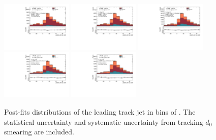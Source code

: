 \begin{figure}[htbp]
  \centering
 \includegraphics[width=0.3\textwidth]{figures/gbb/Sub_Sd0_Fits/Canv_Fit_0-Zp_T-01_coarse_x.pdf}
 \includegraphics[width=0.3\textwidth]{figures/gbb/Sub_Sd0_Fits/Canv_Fit_01-Zp_T-02_coarse_x.pdf}
 \includegraphics[width=0.3\textwidth]{figures/gbb/Sub_Sd0_Fits/Canv_Fit_02-Zp_T-03_coarse_x.pdf}\\
 \includegraphics[width=0.3\textwidth]{figures/gbb/Sub_Sd0_Fits/Canv_Fit_03-Zp_T-04_coarse_x.pdf}
 \includegraphics[width=0.3\textwidth]{figures/gbb/Sub_Sd0_Fits/Canv_Fit_04-Zp_T-05_coarse_x.pdf}


\caption{Post-fits \subsdzero distributions of the leading track jet in bins of \zpt. The statistical uncertainty and systematic uncertainty from tracking $d_0$ smearing are included.}
  \label{fig:ZpT-postfits-leading-sub}
\end{figure}


